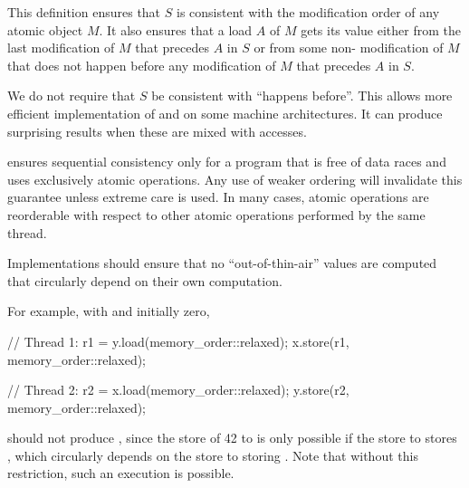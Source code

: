 \pnum
\begin{note}
This definition ensures that $S$ is consistent with
the modification order of any atomic object $M$.
It also ensures that
a  load $A$ of $M$
gets its value either from the last modification of $M$
that precedes $A$ in $S$ or
from some non- modification of $M$
that does not happen before any modification of $M$
that precedes $A$ in $S$.
\end{note}

\pnum
\begin{note}
We do not require that $S$ be consistent with
``happens before''.
This allows more efficient implementation
of  and 
on some machine architectures.
It can produce surprising results
when these are mixed with  accesses.
\end{note}

\pnum
\begin{note}
 ensures sequential consistency only
for a program that is free of data races and
uses exclusively  atomic operations.
Any use of weaker ordering will invalidate this guarantee
unless extreme care is used.
In many cases,  atomic operations are reorderable
with respect to other atomic operations performed by the same thread.
\end{note}

\pnum
Implementations should ensure that no ``out-of-thin-air'' values are computed that
circularly depend on their own computation.

\begin{note}
For example, with  and  initially zero,
\begin{codeblock}
// Thread 1:
r1 = y.load(memory_order::relaxed);
x.store(r1, memory_order::relaxed);
\end{codeblock}

\begin{codeblock}
// Thread 2:
r2 = x.load(memory_order::relaxed);
y.store(r2, memory_order::relaxed);
\end{codeblock}
should not produce , since the store of 42 to  is only
possible if the store to  stores , which circularly depends on the
store to  storing . Note that without this restriction, such an
execution is possible.
\end{note}

